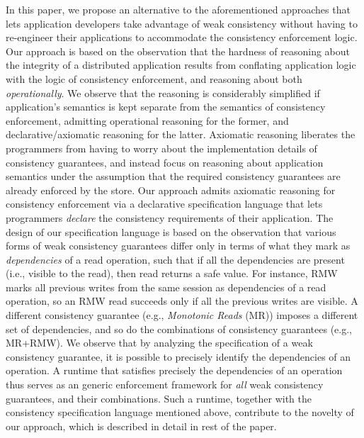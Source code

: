 In this paper, we propose an alternative to the aforementioned
approaches that lets application developers take advantage of weak
consistency without having to re-engineer their applications to
accommodate the consistency enforcement logic. Our approach is based on
the observation that the hardness of reasoning about the integrity of
a distributed application results from conflating application logic
with the logic of consistency enforcement, and reasoning about both
\emph{operationally}.  We observe that the reasoning is considerably
simplified if application's semantics is kept separate from the
semantics of consistency enforcement, admitting operational reasoning
for the former, and declarative/axiomatic reasoning for the latter.
Axiomatic reasoning liberates the programmers from having to worry
about the implementation details of consistency guarantees, and
instead focus on reasoning about application semantics under the
assumption that the required consistency guarantees are already
enforced by the store. Our approach admits axiomatic reasoning for
consistency enforcement via a declarative specification language that
lets programmers \emph{declare} the consistency requirements of their
application. The design of our specification language is based on the
observation that various forms of weak consistency guarantees differ
only in terms of what they mark as \emph{dependencies} of a read
operation, such that if all the dependencies are present (i.e.,
visible to the read), then read returns a safe value.  For instance,
RMW marks all previous writes from the same session as dependencies of
a read operation, so an RMW read succeeds only if all the previous
writes are visible. A different consistency guarantee (e.g.,
\emph{Monotonic Reads} (MR)) imposes a different set of dependencies,
and so do the combinations of consistency guarantees (e.g., MR+RMW).
We observe that by analyzing the specification of a weak consistency
guarantee, it is possible to precisely identify the dependencies of an
operation. A runtime that satisfies precisely the dependencies of an
operation thus serves as an generic enforcement framework for
\emph{all} weak consistency guarantees, and their combinations. Such a
runtime, together with the consistency specification language
mentioned above, contribute to the novelty of our approach, which is
described in detail in rest of the paper.
